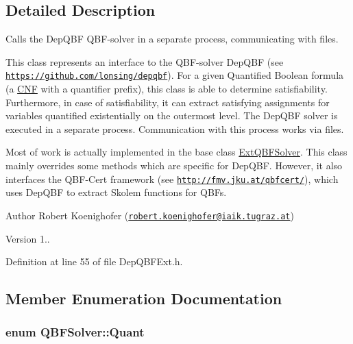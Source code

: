 \subsection{Detailed Description}
Calls the Dep\-Q\-B\-F Q\-B\-F-\/solver in a separate process, communicating with files. 

This class represents an interface to the Q\-B\-F-\/solver Dep\-Q\-B\-F (see \href{https://github.com/lonsing/depqbf}{\tt https\-://github.\-com/lonsing/depqbf}). For a given Quantified Boolean formula (a \hyperlink{classCNF}{C\-N\-F} with a quantifier prefix), this class is able to determine satisfiability. Furthermore, in case of satisfiability, it can extract satisfying assignments for variables quantified existentially on the outermost level. The Dep\-Q\-B\-F solver is executed in a separate process. Communication with this process works via files.

Most of work is actually implemented in the base class \hyperlink{classExtQBFSolver}{Ext\-Q\-B\-F\-Solver}. This class mainly overrides some methods which are specific for Dep\-Q\-B\-F. However, it also interfaces the Q\-B\-F-\/\-Cert framework (see \href{http://fmv.jku.at/qbfcert/}{\tt http\-://fmv.\-jku.\-at/qbfcert/}), which uses Dep\-Q\-B\-F to extract Skolem functions for Q\-B\-Fs.

\begin{DoxyAuthor}{Author}
Robert Koenighofer (\href{mailto:robert.koenighofer@iaik.tugraz.at}{\tt robert.\-koenighofer@iaik.\-tugraz.\-at}) 
\end{DoxyAuthor}
\begin{DoxyVersion}{Version}
1.. 
\end{DoxyVersion}


Definition at line 55 of file Dep\-Q\-B\-F\-Ext.\-h.



\subsection{Member Enumeration Documentation}
\hypertarget{classQBFSolver_ac091e263cb55286cc07b2451bcf4d3c7}{
\subsubsection[{Quant}]{\setlength{\rightskip}{0pt plus 5cm}enum {\bf Q\-B\-F\-Solver\-::\-Quant}\hspace{0.3cm}{\ttfamily [inherited]}}}\label{classQBFSolver_ac091e263cb55286cc07b2451bcf4d3c7}


